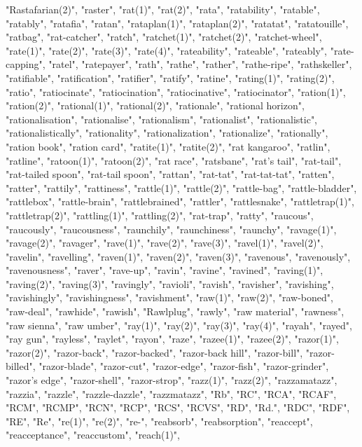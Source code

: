 "Rastafarian(2)",
"raster",
"rat(1)",
"rat(2)",
"rata",
"ratability",
"ratable",
"ratably",
"ratafia",
"ratan",
"rataplan(1)",
"rataplan(2)",
"ratatat",
"ratatouille",
"ratbag",
"rat-catcher",
"ratch",
"ratchet(1)",
"ratchet(2)",
"ratchet-wheel",
"rate(1)",
"rate(2)",
"rate(3)",
"rate(4)",
"rateability",
"rateable",
"rateably",
"rate-capping",
"ratel",
"ratepayer",
"rath",
"rathe",
"rather",
"rathe-ripe",
"rathskeller",
"ratifiable",
"ratification",
"ratifier",
"ratify",
"ratine",
"rating(1)",
"rating(2)",
"ratio",
"ratiocinate",
"ratiocination",
"ratiocinative",
"ratiocinator",
"ration(1)",
"ration(2)",
"rational(1)",
"rational(2)",
"rationale",
"rational horizon",
"rationalisation",
"rationalise",
"rationalism",
"rationalist",
"rationalistic",
"rationalistically",
"rationality",
"rationalization",
"rationalize",
"rationally",
"ration book",
"ration card",
"ratite(1)",
"ratite(2)",
"rat kangaroo",
"ratlin",
"ratline",
"ratoon(1)",
"ratoon(2)",
"rat race",
"ratsbane",
"rat's tail",
"rat-tail",
"rat-tailed spoon",
"rat-tail spoon",
"rattan",
"rat-tat",
"rat-tat-tat",
"ratten",
"ratter",
"rattily",
"rattiness",
"rattle(1)",
"rattle(2)",
"rattle-bag",
"rattle-bladder",
"rattlebox",
"rattle-brain",
"rattlebrained",
"rattler",
"rattlesnake",
"rattletrap(1)",
"rattletrap(2)",
"rattling(1)",
"rattling(2)",
"rat-trap",
"ratty",
"raucous",
"raucously",
"raucousness",
"raunchily",
"raunchiness",
"raunchy",
"ravage(1)",
"ravage(2)",
"ravager",
"rave(1)",
"rave(2)",
"rave(3)",
"ravel(1)",
"ravel(2)",
"ravelin",
"ravelling",
"raven(1)",
"raven(2)",
"raven(3)",
"ravenous",
"ravenously",
"ravenousness",
"raver",
"rave-up",
"ravin",
"ravine",
"ravined",
"raving(1)",
"raving(2)",
"raving(3)",
"ravingly",
"ravioli",
"ravish",
"ravisher",
"ravishing",
"ravishingly",
"ravishingness",
"ravishment",
"raw(1)",
"raw(2)",
"raw-boned",
"raw-deal",
"rawhide",
"rawish",
"Rawlplug",
"rawly",
"raw material",
"rawness",
"raw sienna",
"raw umber",
"ray(1)",
"ray(2)",
"ray(3)",
"ray(4)",
"rayah",
"rayed",
"ray gun",
"rayless",
"raylet",
"rayon",
"raze",
"razee(1)",
"razee(2)",
"razor(1)",
"razor(2)",
"razor-back",
"razor-backed",
"razor-back hill",
"razor-bill",
"razor-billed",
"razor-blade",
"razor-cut",
"razor-edge",
"razor-fish",
"razor-grinder",
"razor's edge",
"razor-shell",
"razor-strop",
"razz(1)",
"razz(2)",
"razzamatazz",
"razzia",
"razzle",
"razzle-dazzle",
"razzmatazz",
"Rb",
"RC",
"RCA",
"RCAF",
"RCM",
"RCMP",
"RCN",
"RCP",
"RCS",
"RCVS",
"RD",
"Rd.",
"RDC",
"RDF",
"RE",
"Re",
"re(1)",
"re(2)",
"re-",
"reabsorb",
"reabsorption",
"reaccept",
"reacceptance",
"reaccustom",
"reach(1)",
